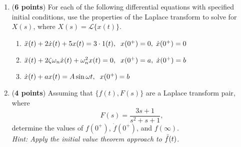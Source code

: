\documentclass[]{article}
\begin{document}
\begin{enumerate}
    \item (\textbf{6 points}) For each of the following differential equations with specified initial conditions, use the properties of the Laplace transform to solve for $X(s)$, where $X(s)=\mathcal{L}\{x(t)\}$.
    \begin{enumerate}
        \item $\Ddot{x}(t)+2\Dot{x}(t)+5x(t)=3\cdot1(t),\hspace{0.2cm} x(0^+)=0,\hspace{0.1cm} \Dot{x}(0^+)=0$
        \item $\Ddot{x}(t)+2\zeta\omega_n\Dot{x}(t)+\omega_n^2x(t)=0,\hspace{0.2cm} x(0^+)=a,\hspace{0.1cm} \Dot{x}(0^+)=b$
        \item $\Dot{x}(t)+ax(t)=A\sin{\omega t},\hspace{0.2cm} x(0^+)=b$
    \end{enumerate}
    \vspace{0.4 cm}

    \item (\textbf{4 points}) Assuming that $\{f(t),F(s)\}$ are a Laplace transform pair, where
    $$F(s)=\frac{3s+1}{s^2+s+1},$$
    determine the values of $f(0^+)$, $\Dot{f}(0^+)$, and $f(\infty)$.\vspace{0.2 cm}\\
    \textit{Hint: Apply the initial value theorem approach to} $\Ddot{f}(t)$.
    \vspace{0.4 cm}

\end{enumerate}
\end{document}
